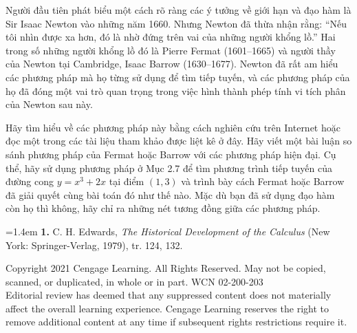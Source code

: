 \noindent
\begin{tcolorbox}[
  enhanced,
  colback=projectbg,
  colframe=projectbg,
  boxrule=0pt,
  arc=0pt,
  left=0pt,
  right=12pt,
  top=12pt,
  bottom=14pt,
  width=\linewidth
]
  \noindent
  \begin{minipage}[t]{0.30\linewidth}
    \hfill
  \end{minipage}%
  \hfill
  \begin{minipage}[t]{0.66\linewidth}
    \fontsize{9.3}{13.4}\selectfont
    Người đầu tiên phát biểu một cách rõ ràng các ý tưởng về giới hạn và đạo hàm là Sir Isaac Newton vào những năm 1660. Nhưng Newton đã thừa nhận rằng: “Nếu tôi nhìn được xa hơn, đó là nhờ đứng trên vai của những người khổng lồ.” Hai trong số những người khổng lồ đó là Pierre Fermat (1601--1665) và người thầy của Newton tại Cambridge, Isaac Barrow (1630--1677). Newton đã rất am hiểu các phương pháp mà họ từng sử dụng để tìm tiếp tuyến, và các phương pháp của họ đã đóng một vai trò quan trọng trong việc hình thành phép tính vi tích phân của Newton sau này.

    \vspace{0.75em}
    Hãy tìm hiểu về các phương pháp này bằng cách nghiên cứu trên Internet hoặc đọc một trong các tài liệu tham khảo được liệt kê ở đây. Hãy viết một bài luận so sánh phương pháp của Fermat hoặc Barrow với các phương pháp hiện đại. Cụ thể, hãy sử dụng phương pháp ở Mục 2.7 để tìm phương trình tiếp tuyến của đường cong $y = x^3 + 2x$ tại điểm $(1, 3)$ và trình bày cách Fermat hoặc Barrow đã giải quyết cùng bài toán đó như thế nào. Mặc dù bạn đã sử dụng đạo hàm còn họ thì không, hãy chỉ ra những nét tương đồng giữa các phương pháp.

    \vspace{0.85em}
    \hangindent=1.4em
    \textbf{1.} C. H. Edwards, \textit{The Historical Development of the Calculus} (New York: Springer-Verlag, 1979), tr. 124, 132.
  \end{minipage}
\end{tcolorbox}

\vfill

\begin{center}
  {\color{copyrightgray}\fontsize{6.5}{8}\selectfont
  Copyright 2021 Cengage Learning. All Rights Reserved. May not be copied, scanned, or duplicated, in whole or in part. WCN 02-200-203\\
  Editorial review has deemed that any suppressed content does not materially affect the overall learning experience. Cengage Learning reserves the right to remove additional content at any time if subsequent rights restrictions require it.}
\end{center}
